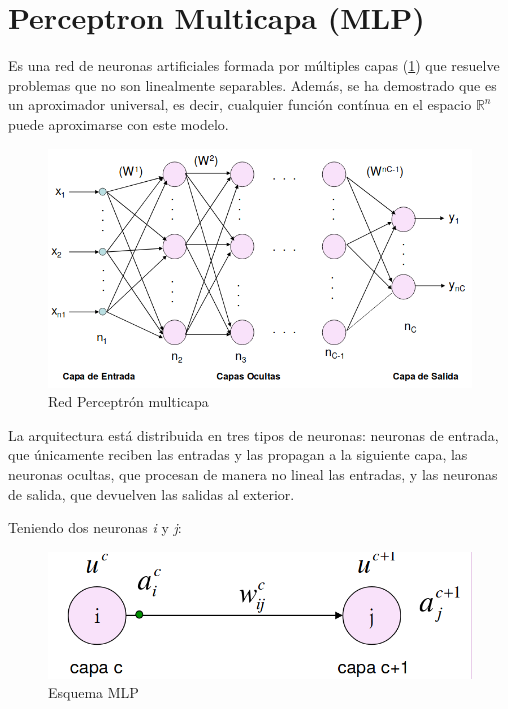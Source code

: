 \documentclass[11pt,spanish,listoffigures,listoftables]{workluis}
\begin{document}
\section{Perceptron Multicapa (MLP)}

\par Es una red de neuronas artificiales formada por múltiples capas (\ref{fig:mlp}) que resuelve problemas que no son linealmente separables. Además, se ha demostrado que es un aproximador universal, es decir,  cualquier función contínua en el espacio $\mathbb{R}^n$ puede aproximarse con este modelo. 

\begin{figure}[H]
\centering
\includegraphics[scale=0.5]{mlp}
\caption{Red Perceptrón multicapa \cite{MLP}}\label{fig:mlp}
\end{figure}

\par La arquitectura está distribuida en tres tipos de neuronas: neuronas de entrada, que únicamente reciben las entradas y las propagan a la siguiente capa, las neuronas ocultas, que procesan de manera no lineal las entradas, y las neuronas de salida, que devuelven las salidas al exterior.

\par Teniendo dos neuronas \textit{i} y \textit{j}:

\begin{figure}[H]
\centering
\includegraphics[scale=0.3]{mlpesquema}
\caption{Esquema MLP \cite{MLP}}\label{fig:esquema}
\end{figure}
\end{document}

